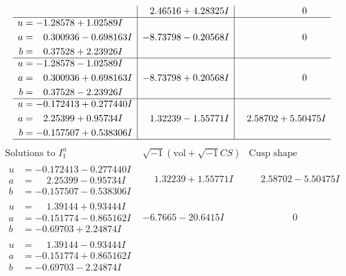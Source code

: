 \documentclass[1p]{elsarticle_modified}
\theoremstyle{definition}
\newcommand{\I}{\sqrt{-1}}
\begin{document}
$$\begin{array}{c|c|c}
 & \phantom{-}2.46516 + 4.28325 I & \phantom{-0.000000 } 0 \\ \hline\begin{aligned}
u &= -1.28578 + 1.02589 I \\
a &= \phantom{-}0.300936 - 0.698163 I \\
b &= \phantom{-}0.37528 + 2.23926 I\end{aligned}
 & -8.73798 - 0.20568 I & \phantom{-0.000000 } 0 \\ \hline\begin{aligned}
u &= -1.28578 - 1.02589 I \\
a &= \phantom{-}0.300936 + 0.698163 I \\
b &= \phantom{-}0.37528 - 2.23926 I\end{aligned}
 & -8.73798 + 0.20568 I & \phantom{-0.000000 } 0 \\ \hline\begin{aligned}
u &= -0.172413 + 0.277440 I \\
a &= \phantom{-}2.25399 + 0.95734 I \\
b &= -0.157507 + 0.538306 I\end{aligned}
 & \phantom{-}1.32239 - 1.55771 I & \phantom{-}2.58702 + 5.50475 I\\
 \hline 
 \end{array}$$\newpage$$\begin{array}{c|c|c}  
\text{Solutions to }I^u_{1}& \I (\text{vol} + \sqrt{-1}CS) & \text{Cusp shape}\\
 \hline 
\begin{aligned}
u &= -0.172413 - 0.277440 I \\
a &= \phantom{-}2.25399 - 0.95734 I \\
b &= -0.157507 - 0.538306 I\end{aligned}
 & \phantom{-}1.32239 + 1.55771 I & \phantom{-}2.58702 - 5.50475 I \\ \hline\begin{aligned}
u &= \phantom{-}1.39144 + 0.93444 I \\
a &= -0.151774 - 0.865162 I \\
b &= -0.69703 + 2.24874 I\end{aligned}
 & -6.7665 - 20.6415 I & \phantom{-0.000000 } 0 \\ \hline\begin{aligned}
u &= \phantom{-}1.39144 - 0.93444 I \\
a &= -0.151774 + 0.865162 I \\
b &= -0.69703 - 2.24874 I\end{aligned}

\end{array}$$
\end{document}
